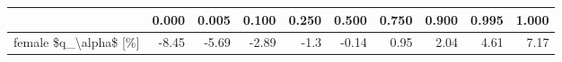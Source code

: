 \begin{tabular}{lrrrrrrrrr}
\toprule
{} &  0.000 &  0.005 &  0.100 &  0.250 &  0.500 &  0.750 &  0.900 &  0.995 &  1.000 \\
\midrule
female \$q\_\textbackslash alpha\$ [\%] &  -8.45 &  -5.69 &  -2.89 &   -1.3 &  -0.14 &   0.95 &   2.04 &   4.61 &   7.17 \\
\bottomrule
\end{tabular}

